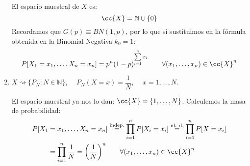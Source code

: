 \begin{ejercicio}
\begin{enumerate}[label=\alph*)]
            El espacio muestral de $X$ es:
            \begin{equation*}
                \cc{X} = \mathbb{N}\cup \{0\}
            \end{equation*}
            Recordamos que $G(p)\equiv BN(1,p)$, por lo que si sustituimos en la fórmula obtenida en la Binomial Negativa $k_0 = 1$:
            \begin{equation*}
                P[X_1=x_1, \ldots, X_n = x_n] = p^{n}{(1-p)}^{\sum\limits_{i=1}^n x_i} \qquad \forall (x_1,\ldots,x_n)\in \cc{X}^n
            \end{equation*}
        \item $X\rightsquigarrow\{P_N : N\in \mathbb{N}\}$, $\quad P_N(X=x) = \dfrac{1}{N}$, $\quad x=1,\ldots,N$.

            El espacio muestral ya nos lo dan: $\cc{X} = \{1,\ldots,N\}$. Calculemos la masa de probabilidad:
            \begin{align*}
                P[X_1 &= x_1, \ldots, X_n = x_n] \stackrel{\text{indep.}}{=} \prod_{i=1}^{n}P[X_i = x_i]\stackrel{\text{id. d.}}{=} \prod_{i=1}^{n} P[X=x_i] \\
                      &= \prod_{i=1}^{n} \dfrac{1}{N} = {\left(\dfrac{1}{N}\right)}^{n} \qquad \forall (x_1,\ldots,x_n) \in \cc{X}^n
            \end{align*}
    \end{enumerate}
\end{ejercicio}

